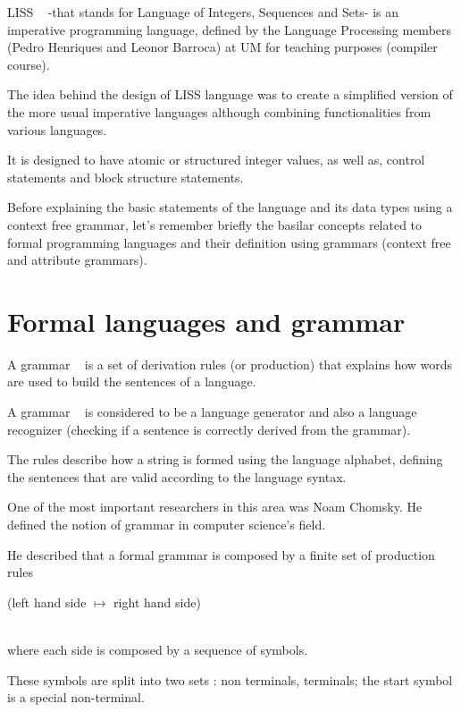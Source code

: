 \documentclass[
  oneside,
  11pt, a4paper,
  footinclude=true,
  headinclude=true,
  cleardoublepage=empty
]{scrbook}
\begin{document}
LISS ~\citep{CH07a} -that stands for Language of Integers, Sequences and Sets- is an imperative programming language, defined by the Language Processing members (Pedro Henriques and Leonor Barroca) at UM for teaching purposes (compiler course).

The idea behind the design of LISS language was to create a simplified version of the more usual imperative languages although combining functionalities from various languages.

It is designed to have atomic or structured integer values, as well as, control statements and block structure statements.


Before explaining the basic statements of the language and its data types using a context free grammar, let’s remember briefly the basilar concepts related to formal programming languages and their definition using grammars (context free and attribute grammars).

\section{Formal languages and grammar}

A grammar ~\citep{Chomsky62a,Gau83a,WG84a,ASU86a,Kas91c,Muchnick97,Hopcroft2006b,Grune2012a} is a set of derivation rules (or production) that explains how words are used to build the sentences of a language.

A grammar ~\citep{DJB88a,Alb91a,Kas91a,SV91a,WAGA90,Rai80a,Fil83a,OPHCC2010} is considered to be a language generator and also a language recognizer (checking if a sentence is correctly derived from the grammar).

The rules describe how a string is formed using the language alphabet, defining the sentences that are valid according to the language syntax.

One of the most important researchers in this area was Noam Chomsky. He defined the notion of grammar in computer science's field.

He described that a formal grammar is composed by a finite set of production rules \\
\centerline{(left hand side $\mapsto$ right hand side)} \\
where each side is composed by a sequence of symbols.

These symbols are split into two sets : non terminals, terminals; the start symbol is a special non-terminal.
\end{document}

